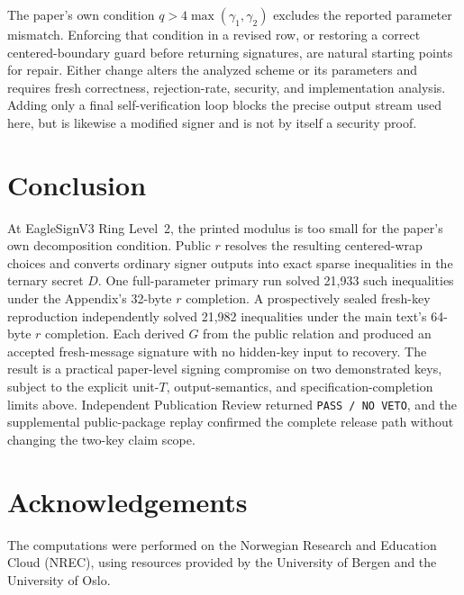 \documentclass[10pt,a4paper]{article}
\begin{document}
The paper's own condition $q>4\max(\gamma_1,\gamma_2)$ excludes the reported
parameter mismatch. Enforcing that condition in a revised row, or restoring a
correct centered-boundary guard before returning signatures, are natural
starting points for repair. Either change alters the analyzed scheme or its
parameters and requires fresh correctness, rejection-rate, security, and
implementation analysis. Adding only a final self-verification loop blocks
the precise output stream used here, but is likewise a modified signer and is
not by itself a security proof.

\section{Conclusion}

At EagleSignV3 Ring Level~2, the printed modulus is too small for the paper's
own decomposition condition. Public $r$ resolves the resulting centered-wrap
choices and converts ordinary signer outputs into exact sparse inequalities in
the ternary secret $D$. One full-parameter primary run solved 21,933 such
inequalities under the Appendix's 32-byte $r$ completion. A prospectively
sealed fresh-key reproduction independently solved 21,982 inequalities under
the main text's 64-byte $r$ completion. Each derived $G$ from the public
relation and produced an accepted fresh-message signature with no hidden-key
input to recovery. The result is a practical paper-level signing compromise on
two demonstrated keys, subject to the explicit unit-$T$, output-semantics, and
specification-completion limits above. Independent Publication Review returned
\texttt{PASS / NO VETO}, and the supplemental public-package replay confirmed
the complete release path without changing the two-key claim scope.

\section*{Acknowledgements}
The computations were performed on the Norwegian Research and Education Cloud (NREC), using resources provided by the University of Bergen and the University of Oslo.
\end{document}
